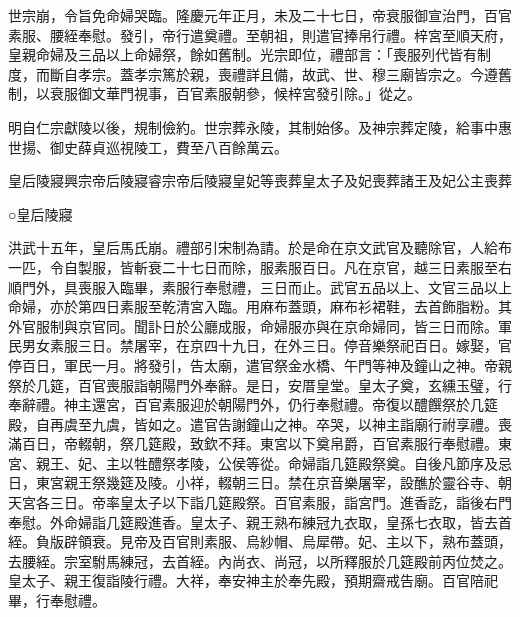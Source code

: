 世宗崩，令旨免命婦哭臨。隆慶元年正月，未及二十七日，帝衰服御宣治門，百官素服、腰絰奉慰。發引，帝行遣奠禮。至朝祖，則遣官捧帛行禮。梓宮至順天府，皇親命婦及三品以上命婦祭，餘如舊制。光宗即位，禮部言：「喪服列代皆有制度，而斷自孝宗。蓋孝宗篤於親，喪禮詳且備，故武、世、穆三廟皆宗之。今遵舊制，以衰服御文華門視事，百官素服朝參，候梓宮發引除。」從之。

明自仁宗獻陵以後，規制儉約。世宗葬永陵，其制始侈。及神宗葬定陵，給事中惠世揚、御史薛貞巡視陵工，費至八百餘萬云。

皇后陵寢興宗帝后陵寢睿宗帝后陵寢皇妃等喪葬皇太子及妃喪葬諸王及妃公主喪葬

○皇后陵寢

洪武十五年，皇后馬氏崩。禮部引宋制為請。於是命在京文武官及聽除官，人給布一匹，令自製服，皆斬衰二十七日而除，服素服百日。凡在京官，越三日素服至右順門外，具喪服入臨畢，素服行奉慰禮，三日而止。武官五品以上、文官三品以上命婦，亦於第四日素服至乾清宮入臨。用麻布蓋頭，麻布衫裙鞋，去首飾脂粉。其外官服制與京官同。聞訃日於公廳成服，命婦服亦與在京命婦同，皆三日而除。軍民男女素服三日。禁屠宰，在京四十九日，在外三日。停音樂祭祀百日。嫁娶，官停百日，軍民一月。將發引，告太廟，遣官祭金水橋、午門等神及鐘山之神。帝親祭於几筵，百官喪服詣朝陽門外奉辭。是日，安厝皇堂。皇太子奠，玄纁玉璧，行奉辭禮。神主還宮，百官素服迎於朝陽門外，仍行奉慰禮。帝復以醴饌祭於几筵殿，自再虞至九虞，皆如之。遣官告謝鐘山之神。卒哭，以神主詣廟行祔享禮。喪滿百日，帝輟朝，祭几筵殿，致欽不拜。東宮以下奠帛爵，百官素服行奉慰禮。東宮、親王、妃、主以牲醴祭孝陵，公侯等從。命婦詣几筵殿祭奠。自後凡節序及忌日，東宮親王祭幾筵及陵。小祥，輟朝三日。禁在京音樂屠宰，設醮於靈谷寺、朝天宮各三日。帝率皇太子以下詣几筵殿祭。百官素服，詣宮門。進香訖，詣後右門奉慰。外命婦詣几筵殿進香。皇太子、親王熟布練冠九衣取，皇孫七衣取，皆去首絰。負版辟領衰。見帝及百官則素服、烏紗帽、烏犀帶。妃、主以下，熟布蓋頭，去腰絰。宗室駙馬練冠，去首絰。內尚衣、尚冠，以所釋服於几筵殿前丙位焚之。皇太子、親王復詣陵行禮。大祥，奉安神主於奉先殿，預期齋戒告廟。百官陪祀畢，行奉慰禮。

